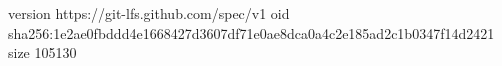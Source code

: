 version https://git-lfs.github.com/spec/v1
oid sha256:1e2ae0fbddd4e1668427d3607df71e0ae8dca0a4c2e185ad2c1b0347f14d2421
size 105130
